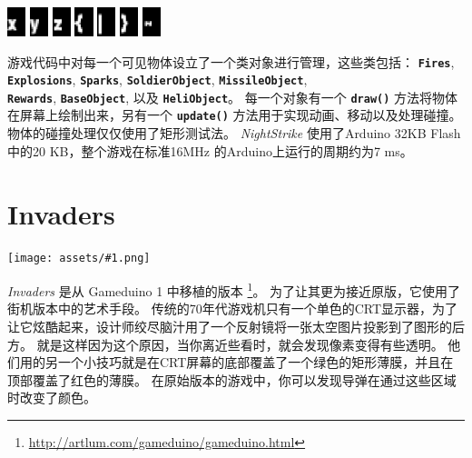 \documentclass[10pt]{book}
\newcommand{\png}[1]{
\begin{center}
\texttt{[image: assets/\#1.png]}
\end{center}
}
\newcommand{\mach}[1]{\texttt{\textbf{#1}}}
\begin{document}
\begin{CJK}{UTF8}{gkai}
\begin{center}
\includegraphics[width=0.04\textwidth]{previews/nightstrike_2-INFOFONT-88.png}
\includegraphics[width=0.04\textwidth]{previews/nightstrike_2-INFOFONT-89.png}
\includegraphics[width=0.04\textwidth]{previews/nightstrike_2-INFOFONT-90.png}
\includegraphics[width=0.04\textwidth]{previews/nightstrike_2-INFOFONT-91.png}
\includegraphics[width=0.04\textwidth]{previews/nightstrike_2-INFOFONT-92.png}
\includegraphics[width=0.04\textwidth]{previews/nightstrike_2-INFOFONT-93.png}
\includegraphics[width=0.04\textwidth]{previews/nightstrike_2-INFOFONT-94.png}
\end{center}

游戏代码中对每一个可见物体设立了一个类对象进行管理，这些类包括：
\mach{Fires},
\mach{Explosions},
\mach{Sparks},
\mach{SoldierObject},
\mach{MissileObject}, \\
\mach{Rewards},
\mach{BaseObject}, 以及
\mach{HeliObject}。
每一个对象有一个 \mach{draw()} 方法将物体在屏幕上绘制出来，另有一个 \mach{update()} 方法用于实现动画、移动以及处理碰撞。
物体的碰撞处理仅仅使用了矩形测试法。
\textit{NightStrike} 使用了Arduino 32KB Flash中的20 KB，整个游戏在标准16MHz
的Arduino上运行的周期约为7 ms。

\newpage
\section{Invaders}

\png{invaders}

\textit{Invaders} 是从 Gameduino 1 中移植的版本 \footnote{
\url{http://artlum.com/gameduino/gameduino.html}}。
为了让其更为接近原版，它使用了街机版本中的艺术手段。
传统的70年代游戏机只有一个单色的CRT显示器，为了让它炫酷起来，设计师绞尽脑汁用了一个反射镜将一张太空图片投影到了图形的后方。
就是这样因为这个原因，当你离近些看时，就会发现像素变得有些透明。
他们用的另一个小技巧就是在CRT屏幕的底部覆盖了一个绿色的矩形薄膜，并且在顶部覆盖了红色的薄膜。
在原始版本的游戏中，你可以发现导弹在通过这些区域时改变了颜色。


\end{CJK}
\end{document}
